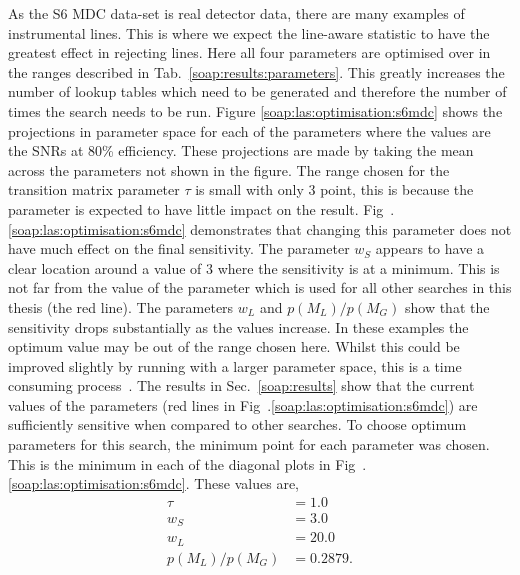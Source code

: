 As the S6 \gls{MDC} data-set is real detector data, there are many examples of instrumental lines. 
This is where we expect the line-aware statistic to have the greatest effect in rejecting lines. 
Here all four parameters are optimised over in the ranges described in Tab.~\ref{soap:results:parameters}. 
This greatly increases the number of lookup tables which need to be generated
and therefore the number of times the search needs to be run. 
Figure \ref{soap:las:optimisation:s6mdc} shows the projections in
parameter space for each of the parameters where the values are the \glspl{SNR} at 80\% efficiency.  
These projections are made by taking the mean~ across the parameters not shown in the figure.
The range chosen for the transition matrix parameter $\tau$ is small with only 3 point, this is because the parameter is expected to have little impact on the result. 
Fig~.\ref{soap:las:optimisation:s6mdc} demonstrates that changing this
parameter does not have much effect on the final sensitivity. 
The parameter $w_S$ appears to have a clear location around a value of $3$ where the sensitivity is at a minimum. This is not far from the value of the parameter which is used for all other searches in this thesis (the red line).
The parameters $w_L$ and $p(M_L)/p(M_G)$ show that the sensitivity drops substantially as the values increase. 
In these examples the optimum value may be out of the range chosen here.
Whilst this could be improved slightly by running with a larger parameter
space, this is a time consuming process~.
The results in Sec.~\ref{soap:results} show that the current values of the parameters (red lines in Fig~.\ref{soap:las:optimisation:s6mdc}) are sufficiently sensitive when compared to other searches.
To choose optimum parameters for this search, the minimum point for each parameter was chosen. 
This is the minimum in each of the diagonal plots in Fig~.\ref{soap:las:optimisation:s6mdc}.
These values are,
\begin{equation}
	\label{soap:las:optimisation:s6_pars}
\begin{split}
	\tau &= 1.0 \\
	w_S &= 3.0 \\
	w_L &= 20.0 \\
	p(M_L)/p(M_G) &= 0.2879 .
\end{split}
\end{equation}
~

